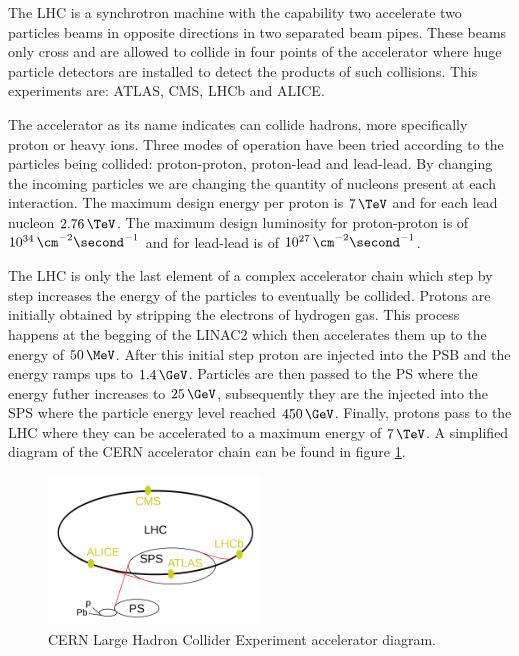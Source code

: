 The \gls{LHC} is a synchrotron machine with the capability two accelerate two particles beams in opposite directions in two separated beam pipes. These beams only cross and are allowed to collide in four points of the accelerator where huge particle detectors are installed to detect the products of such collisions. This experiments are: \gls{ATLAS}\cite{ARTICLE:TheATLASExperiment}, \gls{CMS}\cite{ARTICLE:TheCMSExperiment}, \gls{LHCb}\cite{ARTICLE:TheLHCbExperiment} and \gls{ALICE}\cite{ARTICLE:TheALICEExperiment}.

The accelerator as its name indicates can collide hadrons, more specifically proton or heavy ions. Three modes of operation have been tried according to the particles being collided: proton-proton, proton-lead and lead-lead. By changing the incoming particles we are changing the quantity of nucleons present at each interaction. The maximum design energy per proton is $7\,\TeV$ and for each lead nucleon $2.76\,\TeV$. The maximum design luminosity for proton-proton is of $10^{34}\,\cm^{-2}\second^{-1}$ and for lead-lead is of $10^{27}\,\cm^{-2}\second^{-1}$.

The \gls{LHC} is only the last element of a complex accelerator chain which step by step increases the energy of the particles to eventually be collided. Protons are initially obtained by stripping the electrons of hydrogen gas. This process happens at the begging of the \gls{LINAC2} which then accelerates them up to the energy of $50\,\MeV$. After this initial step proton are injected into the \gls{PSB} and the energy ramps ups to $1.4\,\GeV$. Particles are then passed to the \gls{PS} where the energy futher increases to $25\,\GeV$, subsequently they are the injected into the \gls{SPS} where the particle energy level reached $450\,\GeV$. Finally, protons pass to the \gls{LHC} where they can be accelerated to a maximum energy of $7\,\TeV$. A simplified diagram of the \gls{CERN} accelerator chain can be found in figure \ref{FIGURE:ExperimentalApparatus_LHCAccelaratorChain}.

\begin{figure}[!htb]
  \centering
  \includegraphics[width=0.50\textwidth]{Chapter02/LHC/Images/LHCAccelaratorChain.png}
  \caption{CERN Large Hadron Collider Experiment accelerator diagram.}
  \label{FIGURE:ExperimentalApparatus_LHCAccelaratorChain}
\end{figure}

